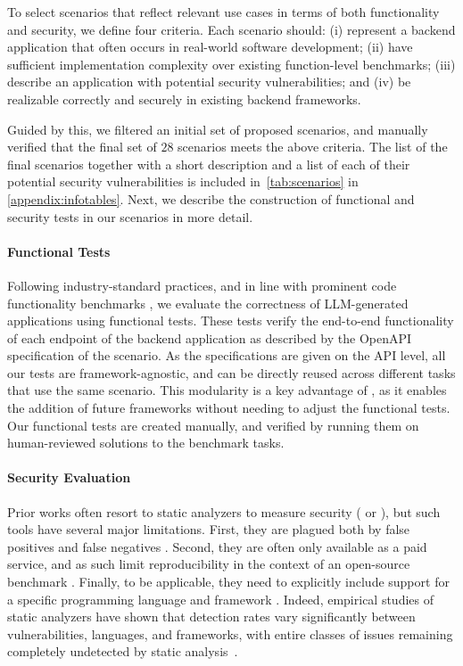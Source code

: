 To select scenarios that reflect relevant use cases in terms of both functionality and security, we define four criteria. Each scenario should:
(i) represent a backend application that often occurs in real-world software development; 
(ii) have sufficient implementation complexity over existing function-level benchmarks; 
(iii) describe an application with potential security vulnerabilities;
and (iv)  be realizable correctly and securely in existing backend frameworks.

Guided by this, we filtered an initial set of proposed scenarios, and manually verified that the final set of $28$ scenarios meets the above criteria. The list of the final scenarios together with a short description and a list of each of their potential security vulnerabilities is included in~\cref{tab:scenarios} in \cref{appendix:infotables}.
Next, we describe the construction of functional and security tests in our scenarios in more detail.

\paragraph{Functional Tests}
Following industry-standard practices, and in line with prominent code functionality benchmarks \citep{humaneval,swebench}, we evaluate the correctness of LLM-generated applications using functional tests. 
These tests verify the end-to-end functionality of each endpoint of the backend application as described by the OpenAPI specification of the scenario. 
As the specifications are given on the API level, all our tests are framework-agnostic, and can be directly reused across different \benchmark{} tasks that use the same scenario. 
This modularity is a key advantage of \benchmark{}, as it enables the addition of future frameworks without needing to adjust the functional tests.
Our functional tests are created manually, and verified by running them on human-reviewed solutions to the benchmark tasks.

\paragraph{Security Evaluation}
Prior works often resort to static analyzers to measure security (\eg \citet{codeguard} or \citet{safecoder}), but such tools have several major limitations.
First, they are plagued both by false positives and false negatives \citep{barrierssast,sastvsllm,ami2024false}.
Second, they are often only available as a paid service, and as such limit reproducibility in the context of an open-source benchmark \citep{cyberseceval,sastvsllm,snykcode}.
Finally, to be applicable, they need to explicitly include support for a specific programming language and framework \citep{barrierssast,sastvsllm,ami2024false}.
Indeed, empirical studies of static analyzers have shown that detection rates vary significantly between vulnerabilities, languages, and frameworks, with entire classes of issues remaining completely undetected by static analysis~\citep{li2024llmsast, sastvsllm}.

